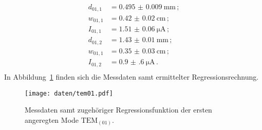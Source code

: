 \begin{align}
  d_{01,1}&=\SI{0.495(9)}{\milli\meter}\,\text{;}\\
  w_{01,1}&=\SI{0.42(2)}{\centi\meter} \,\text{;}\\
  I_{01,1}&=\SI{1.51(6)}{\micro\ampere}\,\text{;}\\
  d_{01,2}&=\SI{1.43(1)}{\milli\meter} \,\text{;}\\
  w_{01,1}&=\SI{0.35(3)}{\centi\meter} \,\text{;}\\
  I_{01,2}&=\SI{0.9(6)}{\micro\ampere}\,\text{.}\\
\end{align}
In Abbildung~\ref{fig:tem01} finden sich die Messdaten samt ermittelter Regressionsrechnung.
\begin{figure}
  \centering
  \texttt{[image: daten/tem01.pdf]}
  \caption{Messdaten samt zugehöriger Regressionsfunktion der ersten angeregten Mode $\text{TEM}_{(01)}$.}
  \label{fig:tem01}
\end{figure}
